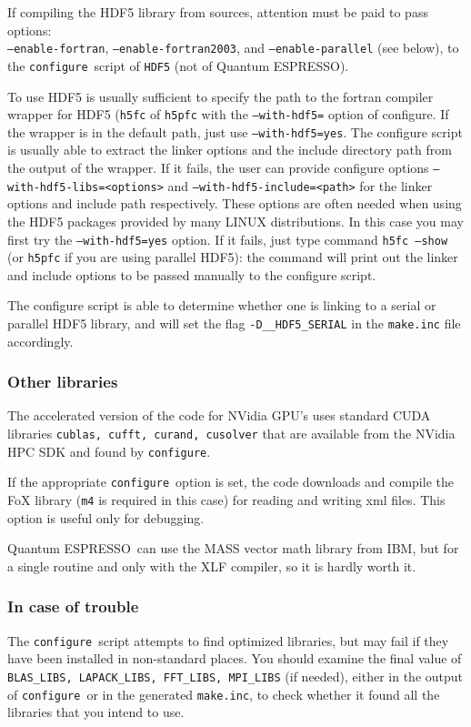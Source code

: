 \documentclass[12pt,a4paper]{article}
\def\qe{{\sc Quantum ESPRESSO}}
\def\configure{\texttt{configure}}
\begin{document}
If compiling the HDF5 library from sources, attention must be paid
to pass options:\\
\texttt{--enable-fortran}, \texttt{--enable-fortran2003}, and 
\texttt{--enable-parallel} (see below),
to the \configure{}ript of \texttt{HDF5} (not of \qe).

To use HDF5 is usually sufficient to specify the path to the fortran
compiler wrapper for HDF5 (\texttt{h5fc} of \texttt{h5pfc} with the
\texttt{--with-hdf5=} option of configure. If the wrapper is in the
default path, just use \texttt{--with-hdf5=yes}.
The configure script is usually able to extract the linker options
and the include directory path from the output of the wrapper. If it
fails, the user can provide configure options
\texttt{--with-hdf5-libs=<options>} and \texttt{--with-hdf5-include=<path>}
for the linker options and include path respectively.
These options are often needed when using the HDF5 packages
provided by many LINUX distributions. In this case you may first try
the \texttt{--with-hdf5=yes} option. If it fails, just type command
\texttt{h5fc --show} (or \texttt{h5pfc} if you are using parallel HDF5):
the command will print out the linker and include options to be passed
manually to the configure script.

The configure script is able to determine whether one is linking to a
serial or parallel HDF5 library, and will  set the flag
\texttt{-D\_\_HDF5\_SERIAL} in the \texttt{make.inc} file accordingly.


\subsubsection{Other libraries}
The accelerated version of the code for NVidia GPU's uses standard CUDA 
libraries \texttt{cublas, cufft, curand, cusolver} that are available 
from the NVidia HPC SDK and found by \configure.

If the appropriate \configure\ option is set, the code downloads and compile 
the FoX library (\texttt{m4} is required in this case) for reading and writing
xml files.  This option is useful only for debugging. 

\qe\ can use the MASS vector math library from IBM, but for a single routine
and only with the XLF compiler, so it is hardly worth it.

\subsubsection{In case of trouble}
The \configure\ script attempts to find optimized libraries, but may fail
if they have been installed in non-standard places. You should examine
the final value of \texttt{BLAS\_LIBS, LAPACK\_LIBS, FFT\_LIBS, MPI\_LIBS} (if needed), either in the output of \configure\ or in the generated
\texttt{make.inc}, to check whether it found all the libraries that you intend to use.
\end{document}
